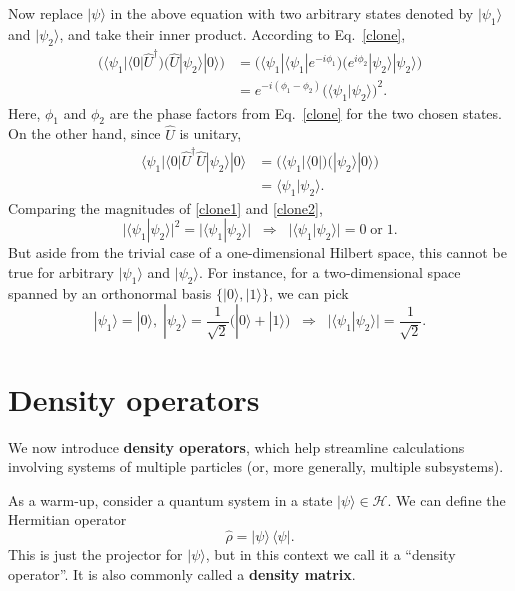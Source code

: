 \documentclass[pra,12pt]{revtex4-2}
\begin{document}
Now replace $|\psi\rangle$ in the above equation with two arbitrary
states denoted by $|\psi_1\rangle$ and $|\psi_2\rangle$, and take
their inner product.  According to Eq.~\eqref{clone},
\begin{align}
  \Big(\langle \psi_1 | \langle 0 | \hat{U}^\dagger \Big)
  \Big(\hat{U} | \psi_2 \rangle |0\rangle \Big)
  &=  \Big(\langle \psi_1| \langle \psi_1| e^{-i\phi_1} \Big) \Big( e^{i\phi_2} |\psi_2\rangle|\psi_2\rangle\Big) \\
  &= e^{-i(\phi_1-\phi_2)} \Big( \langle\psi_1 | \psi_2\rangle \Big)^2. \label{clone1}
\end{align}
Here, $\phi_1$ and $\phi_2$ are the phase factors from
Eq.~\eqref{clone} for the two chosen states.  On the other hand, since
$\hat{U}$ is unitary,
\begin{align}
  \langle \psi_1 | \langle 0 | \hat{U}^\dagger \hat{U} | \psi_2 \rangle |0\rangle
  &= \Big(\langle \psi_1 | \langle 0| \Big) \Big(| \psi_2 \rangle |0\rangle\Big)
  \\ &= \langle\psi_1 | \psi_2\rangle. \label{clone2}
\end{align}
Comparing the magnitudes of \eqref{clone1} and \eqref{clone2},
\begin{equation}
  \big|\langle \psi_1 | \psi_2\rangle \big|^2
  = \big| \langle\psi_1 | \psi_2\rangle \big|
  \;\;\Rightarrow \;\;
  \big|\langle\psi_1 | \psi_2\rangle\big| = 0 \;\mathrm{or}\; 1.
\end{equation}
But aside from the trivial case of a one-dimensional Hilbert space,
this cannot be true for arbitrary $|\psi_1\rangle$ and
$|\psi_2\rangle$.  For instance, for a two-dimensional space spanned
by an orthonormal basis $\{|0\rangle, |1\rangle\}$, we can pick
\begin{equation}
  |\psi_1\rangle = |0\rangle, \;
  |\psi_2\rangle = \frac{1}{\sqrt{2}}\big(|0\rangle +
  |1\rangle\big)
  \;\;\Rightarrow\;\;
  \big|\langle\psi_1|\psi_2\rangle\big| = \frac{1}{\sqrt{2}}.
\end{equation}

\section{Density operators}

We now introduce \textbf{density operators}, which help streamline
calculations involving systems of multiple particles (or, more
generally, multiple subsystems).

As a warm-up, consider a quantum system in a state $|\psi\rangle \in
\mathscr{H}$.  We can define the Hermitian operator
\begin{equation}
  \hat{\rho} = |\psi\rangle\, \langle\psi|.
  \label{rho_pure}
\end{equation}
This is just the projector for $|\psi\rangle$, but in this context we
call it a ``density operator''.  It is also commonly called a
\textbf{density matrix}.
\end{document}
